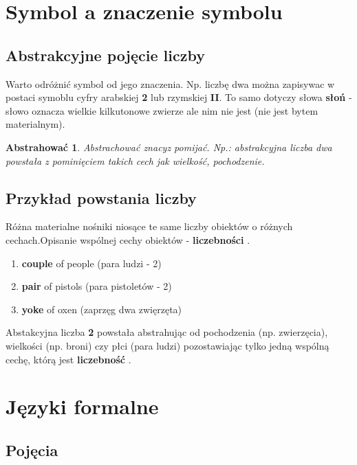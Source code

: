 \section{Symbol a znaczenie symbolu}

 \subsection{Abstrakcyjne pojęcie liczby}


Warto odróżnić symbol od jego znaczenia. Np. liczbę dwa można zapisywac w postaci symoblu cyfry arabskiej { \bf 2} lub rzymskiej  { \bf II}. To samo dotyczy słowa { \bf słoń } - słowo oznacza wielkie kilkutonowe zwierze ale nim nie jest (nie jest bytem materialnym). 

\newtheorem*{theorem2*}{Abstrahować}
\begin{theorem2*} Abstrachować znacyz pomijać. Np.: abstrakcyjna liczba dwa powstała z pominięciem takich cech jak wielkość, pochodzenie.
 \end{theorem2*}
 
\subsection{Przykład powstania liczby}
Różna materialne nośniki niosące te same liczby obiektów o różnych cechach.Opisanie wspólnej cechy obiektów - { \bf liczebności} .

 
\begin{enumerate}[label=(\roman*)]
  \item {\bf couple} of people (para ludzi - 2)
  \item {\bf pair} of pistols (para pistoletów - 2)
  \item {\bf yoke} of oxen (zaprzęg dwa zwięrzęta)
\end{enumerate}
 
 

Abstakcyjna liczba { \bf 2} powstała abstrahując od pochodzenia (np. zwierzęcia), wielkości (np. broni) czy płci (para ludzi) pozostawiając tylko jedną wspólną cechę, którą jest { \bf liczebność} . 
 


\section{Języki formalne}
\subsection{Pojęcia}

